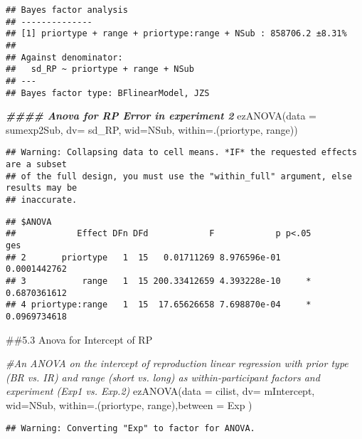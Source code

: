 \documentclass[
]{article}
\newenvironment{Shaded}{\begin{snugshade}}{\end{snugshade}}
\newcommand{\AttributeTok}[1]{\textcolor[rgb]{0.77,0.63,0.00}{#1}}
\newcommand{\CommentTok}[1]{\textcolor[rgb]{0.56,0.35,0.01}{\textit{#1}}}
\newcommand{\DocumentationTok}[1]{\textcolor[rgb]{0.56,0.35,0.01}{\textbf{\textit{#1}}}}
\newcommand{\FunctionTok}[1]{\textcolor[rgb]{0.00,0.00,0.00}{#1}}
\newcommand{\NormalTok}[1]{#1}
\begin{document}
\begin{verbatim}
## Bayes factor analysis
## --------------
## [1] priortype + range + priortype:range + NSub : 858706.2 ±8.31%
## 
## Against denominator:
##   sd_RP ~ priortype + range + NSub 
## ---
## Bayes factor type: BFlinearModel, JZS
\end{verbatim}

\begin{Shaded}
\begin{Highlighting}[]
\DocumentationTok{\#\#\#\# Anova for RP Error in experiment 2}
 \FunctionTok{ezANOVA}\NormalTok{(}\AttributeTok{data =}\NormalTok{ sumexp2Sub, }\AttributeTok{dv=}\NormalTok{ sd\_RP, }\AttributeTok{wid=}\NormalTok{NSub, }\AttributeTok{within=}\NormalTok{.(priortype, range))}
\end{Highlighting}
\end{Shaded}

\begin{verbatim}
## Warning: Collapsing data to cell means. *IF* the requested effects are a subset
## of the full design, you must use the "within_full" argument, else results may be
## inaccurate.
\end{verbatim}

\begin{verbatim}
## $ANOVA
##            Effect DFn DFd            F            p p<.05          ges
## 2       priortype   1  15   0.01711269 8.976596e-01       0.0001442762
## 3           range   1  15 200.33412659 4.393228e-10     * 0.6870361612
## 4 priortype:range   1  15  17.65626658 7.698870e-04     * 0.0969734618
\end{verbatim}

\#\#5.3 Anova for Intercept of RP

\begin{Shaded}
\begin{Highlighting}[]
\CommentTok{\#An ANOVA on the intercept of reproduction linear regression with prior type (BR vs. IR) and range (short vs. long) as within{-}participant factors and experiment (Exp1 vs. Exp.2) }
\FunctionTok{ezANOVA}\NormalTok{(}\AttributeTok{data =}\NormalTok{ cilist, }\AttributeTok{dv=}\NormalTok{ mIntercept, }\AttributeTok{wid=}\NormalTok{NSub, }\AttributeTok{within=}\NormalTok{.(priortype, range),}\AttributeTok{between =}\NormalTok{ Exp )}
\end{Highlighting}
\end{Shaded}

\begin{verbatim}
## Warning: Converting "Exp" to factor for ANOVA.
\end{verbatim}
\end{document}
